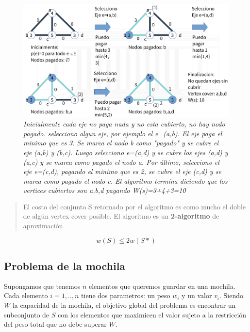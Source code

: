 \documentclass{article}
\begin{document}
\begin{figure}[h!]
    \begin{center} 
    \includegraphics[width=\linewidth]{imagenes/ejemplo-aprox-vertexcover.png}
    \caption{\small \sl Inicialmente cada eje no paga nada y no esta cubierto, no hay nodo pagado. 
    selecciono algun eje, por ejemplo el e=(a,b). 
    El eje paga el minimo que es 3. Se marca el nodo b como "pagado" y se cubre el eje (a,b) y (b,c).
    Luego selecciono e=(a,d) y se cubre los ejes (a,d) y (a,c) y se marca como pagado el nodo a.
    Por último, selecciono el eje e=(c,d), pagando el minimo que es 2, se cubre el eje (c,d) y se marca como pagado el nodo c.
    El algoritmo termina diciendo que los vertices cubiertos son a,b,d pagando W(s)=3+4+3=10} 
    \end{center}
\end{figure}

\begin{quote}
    El costo del conjunto S retornado por el algoritmo es como mucho el doble de algún vertex cover posible.
    El algoritmo es un \textbf{2-algoritmo} de aproximación
\end{quote}

\[
    w(S) \leq 2w(S*)
\]


\newpage
\subsection{Problema de la mochila}

Supongamos que tenemos \(n\) elementos que queremos guardar en una mochila. Cada elemento \(i=1,..,n\)
tiene dos parametros: un peso \(w_i\) y un valor \(v_i\). Siendo \(W\) la capacidad de la mochila, el
objetivo global del problema es encontrar un subconjunto de \(S\) con los elementos que maximicen el 
valor sujeto a la restricción del peso total que no debe superar \(W\).
\end{document}
